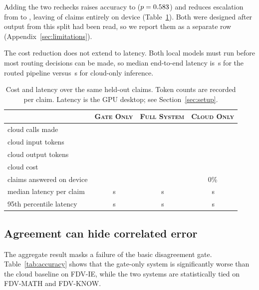\documentclass{article}
\begin{document}
Adding the two rechecks raises accuracy to \accFull{} ($p = 0.583{}$) and reduces escalation from \escRate{} to \fullEscRate{}, leaving \fullOnDeviceRate{} of claims entirely on device (Table~\ref{tab:cost}). Both were designed after output from this split had been read, so we report them as a separate row (Appendix~\ref{sec:limitations}).

The cost reduction does not extend to latency. Both local models must run before most routing decisions can be made, so median end-to-end latency is \latRoutedMed{}\,s for the routed pipeline versus \latCloudMed{}\,s for cloud-only inference.

\begin{table}[t]
\caption{Cost and latency over the same \nTest{} held-out claims. Token counts are recorded
per claim. Latency is the GPU desktop; see Section~\ref{sec:setup}.}
\label{tab:cost}
\centering
\begin{tabular}{lccc}
\toprule
 & \textsc{Gate Only} & \textsc{\textbf{Full System}} & \textsc{Cloud Only} \\
\midrule
cloud calls made              & \cloudCalls{}        & \textbf{\fullCloudCalls{}}   & \nTest{} \\
cloud input tokens            & \tokensRoutedIn{}    & \tokensFullIn{}    & \tokensCloudIn{} \\
cloud output tokens           & \tokensRoutedOut{}   & \tokensFullOut{}   & \tokensCloudOut{} \\
cloud cost                    & \costRouted{}        & \textbf{\costFull{}}        & \costCloud{} \\
claims answered on device     & \onDeviceRate{}      & \textbf{\fullOnDeviceRate{}} & 0\% \\
\midrule
median latency per claim      & \latRoutedMed{}\,s   & \latFullMed{}\,s   & \latCloudMed{}\,s \\
95th percentile latency       & \latRoutedPFive{}\,s & \latFullPFive{}\,s & \latCloudPFive{}\,s \\
\bottomrule
\end{tabular}
\end{table}

\subsection{Agreement can hide correlated error}
\label{sec:ie}

The aggregate result masks a failure of the basic disagreement gate. Table~\ref{tab:accuracy} shows that the gate-only system is significantly worse than the cloud baseline on FDV-IE, while the two systems are statistically tied on FDV-MATH and FDV-KNOW.
\end{document}

